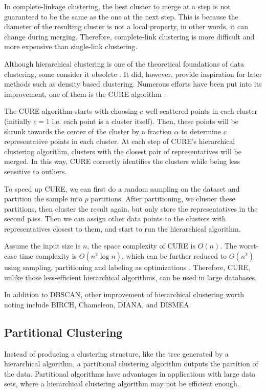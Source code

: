 \documentclass[conference]{IEEEtran}
\begin{document}
In complete-linkage clustering, the best cluster to merge at a step is not guaranteed to be the same as the one at the next step. This is because the diameter of the resulting cluster is not a local property, in other words, it can change during merging. Therefore, complete-link clustering is more difficult and more expensive than single-link clustering.

Although hierarchical clustering is one of the theoretical foundations of data clustering, some consider it obsolete \cite{jain2012survey}. It did, however, provide inspiration for later methods such as density based clustering. Numerous efforts have been put into its improvement, one of them is the CURE algorithm \cite{guha1998cure}.

The CURE algorithm starts with choosing $c$ well-scattered points in each cluster (initially $c = 1$ i.e. each point is a cluster itself). Then, these points will be shrunk towards the center of the cluster by a fraction $\alpha$ to determine $c$ representative points in each cluster. At each step of CURE's hierarchical clustering algorithm, clusters with the closest pair of representatives will be merged. In this way, CURE correctly identifies the clusters while being less sensitive to outliers.

To speed up CURE, we can first do a random sampling on the dataset and partition the sample into $p$ partitions. After partitioning, we cluster these partitions, then cluster the result again, but only store the representatives in the second pass. Then we can assign other data points to the clusters with representatives closest to them, and start to run the hierarchical algorithm.

Assume the input size is $n$, the space complexity of CURE is $O(n)$. The worst-case time complexity is $O(n^{2}\log n)$, which can be further reduced to $O(n^{2})$ using sampling, partitioning and labeling as optimizations \cite{gan2007data}. Therefore, CURE, unlike those less-efficient hierarchical algorithms, can be used in large databases.


In addition to DBSCAN, other improvement of hierarchical clustering worth noting include BIRCH, Chameleon, DIANA\cite{kaufman2009finding}, and DISMEA.

\subsection{Partitional Clustering}
Instead of producing a clustering structure, like the tree generated by a hierarchical algorithm, a partitional clustering algorithm outputs the partition of the data. Partitional algorithms have advantages in applications with large data sets, where a hierarchical clustering algorithm may not be efficient enough.
\end{document}
